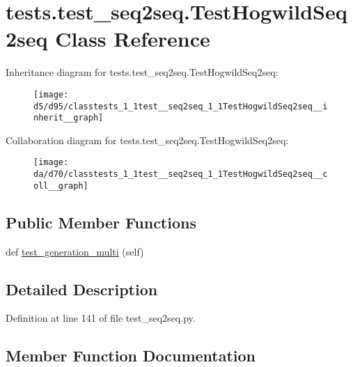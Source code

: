 \hypertarget{classtests_1_1test__seq2seq_1_1TestHogwildSeq2seq}{}\section{tests.\+test\+\_\+seq2seq.\+Test\+Hogwild\+Seq2seq Class Reference}
\label{classtests_1_1test__seq2seq_1_1TestHogwildSeq2seq}


Inheritance diagram for tests.\+test\+\_\+seq2seq.\+Test\+Hogwild\+Seq2seq\+:\nopagebreak
\begin{figure}[H]
\begin{center}
\leavevmode
\texttt{[image: d5/d95/classtests\_1\_1test\_\_seq2seq\_1\_1TestHogwildSeq2seq\_\_inherit\_\_graph]}
\end{center}
\end{figure}


Collaboration diagram for tests.\+test\+\_\+seq2seq.\+Test\+Hogwild\+Seq2seq\+:\nopagebreak
\begin{figure}[H]
\begin{center}
\leavevmode
\texttt{[image: da/d70/classtests\_1\_1test\_\_seq2seq\_1\_1TestHogwildSeq2seq\_\_coll\_\_graph]}
\end{center}
\end{figure}
\subsection*{Public Member Functions}
\begin{DoxyCompactItemize}
\item 
def \hyperlink{classtests_1_1test__seq2seq_1_1TestHogwildSeq2seq_ae5d33c237b20de2e7bbe59058c181f38}{test\+\_\+generation\+\_\+multi} (self)
\end{DoxyCompactItemize}


\subsection{Detailed Description}


Definition at line 141 of file test\+\_\+seq2seq.\+py.



\subsection{Member Function Documentation}
\mbox{\label{classtests_1_1test__seq2seq_1_1TestHogwildSeq2seq_ae5d33c237b20de2e7bbe59058c181f38}} 
